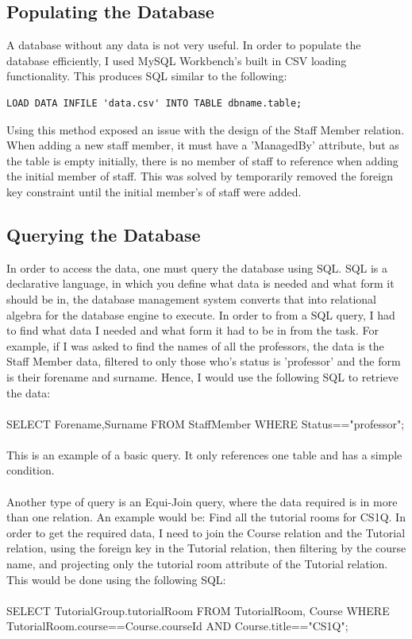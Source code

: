 \documentclass[12pt]{article}
\begin{document}
\subsection{Populating the Database}
A database without any data is not very useful.
In order to populate the database efficiently, I used MySQL Workbench's built in CSV loading functionality.
This produces SQL similar to the following:
\begin{lstlisting}
LOAD DATA INFILE 'data.csv' INTO TABLE dbname.table;
\end{lstlisting}
Using this method exposed an issue with the design of the Staff Member relation.
When adding a new staff member, it must have a 'ManagedBy' attribute, but as the table is empty initially, there is no member of staff to reference when adding the initial member of staff.
This was solved by temporarily removed the foreign key constraint until the initial member's of staff were added.

\subsection{Querying the Database}
In order to access the data, one must query the database using SQL.
SQL is a declarative language, in which you define what data is needed and what form it should be in, the database management system converts that into relational algebra for the database engine to execute.
In order to from a SQL query, I had to find what data I needed and what form it had to be in from the task.
For example, if I was asked to find the names of all the professors, the data is the Staff Member data, filtered to only those who's status is 'professor' and the form is their forename and surname.
Hence, I would use the following SQL to retrieve the data:
\\\\
SELECT Forename,Surname FROM StaffMember WHERE Status=="professor";
\\\\
This is an example of a basic query.
It only references one table and has a simple condition.
\\\\
Another type of query is an Equi-Join query, where the data required is in more than one relation.
An example would be: Find all the tutorial rooms for CS1Q.
In order to get the required data, I need to join the Course relation and the Tutorial relation, using the foreign key in the Tutorial relation, then filtering by the course name, and projecting only the tutorial room attribute of the Tutorial relation.
This would be done using the following SQL:
\\\\
SELECT TutorialGroup.tutorialRoom FROM TutorialRoom, Course WHERE TutorialRoom.course==Course.courseId AND Course.title=="CS1Q";
\\
\end{document}
